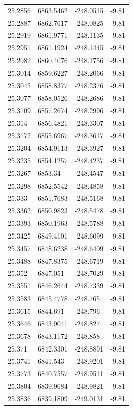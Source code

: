 \begin{table}[H]
\begin{tabular}{llll}
25.2856 & 6863.5462 & -248.0515 & -9.81 \\
25.2887 & 6862.7617 & -248.0825 & -9.81 \\
25.2919 & 6861.9771 & -248.1135 & -9.81 \\
25.2951 & 6861.1924 & -248.1445 & -9.81 \\
25.2982 & 6860.4076 & -248.1756 & -9.81 \\
25.3014 & 6859.6227 & -248.2066 & -9.81 \\
25.3045 & 6858.8377 & -248.2376 & -9.81 \\
25.3077 & 6858.0526 & -248.2686 & -9.81 \\
25.3109 & 6857.2674 & -248.2996 & -9.81 \\
25.314 & 6856.4821 & -248.3307 & -9.81 \\
25.3172 & 6855.6967 & -248.3617 & -9.81 \\
25.3204 & 6854.9113 & -248.3927 & -9.81 \\
25.3235 & 6854.1257 & -248.4237 & -9.81 \\
25.3267 & 6853.34 & -248.4547 & -9.81 \\
25.3298 & 6852.5542 & -248.4858 & -9.81 \\
25.333 & 6851.7683 & -248.5168 & -9.81 \\
25.3362 & 6850.9823 & -248.5478 & -9.81 \\
25.3393 & 6850.1963 & -248.5788 & -9.81 \\
25.3425 & 6849.4101 & -248.6099 & -9.81 \\
25.3457 & 6848.6238 & -248.6409 & -9.81 \\
25.3488 & 6847.8375 & -248.6719 & -9.81 \\
25.352 & 6847.051 & -248.7029 & -9.81 \\
25.3551 & 6846.2644 & -248.7339 & -9.81 \\
25.3583 & 6845.4778 & -248.765 & -9.81 \\
25.3615 & 6844.691 & -248.796 & -9.81 \\
25.3646 & 6843.9041 & -248.827 & -9.81 \\
25.3678 & 6843.1172 & -248.858 & -9.81 \\
25.371 & 6842.3301 & -248.8891 & -9.81 \\
25.3741 & 6841.543 & -248.9201 & -9.81 \\
25.3773 & 6840.7557 & -248.9511 & -9.81 \\
25.3804 & 6839.9684 & -248.9821 & -9.81 \\
25.3836 & 6839.1809 & -249.0131 & -9.81 \\

\end{tabular}
\end{table}
